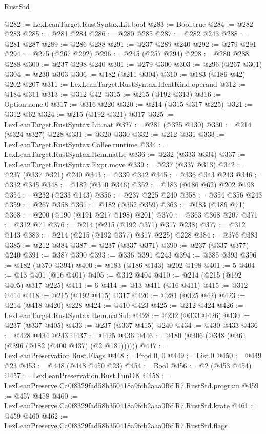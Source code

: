 \begin{lexlean}{RustStd}
\begin{coremodule}
@282 := LexLeanTarget.RustSyntax.Lit.bool
@283 := Bool.true
@284 := @282 @283
@285 := @281 @284
@286 := @280 @285
@287 := @282 @243
@288 := @281 @287
@289 := @286 @288
@291 := @237 @289 @240
@292 := @279 @291
@294 := @275 (@267 @292)
@296 := @245 (@257 @294)
@298 := @280 @288 @288
@300 := @237 @298 @240
@301 := @279 @300
@303 := @296 (@267 @301)
@304 := @230 @303
@306 := @182 (@211 @304)
@310 := @183 (@186 @42) @202 @207
@311 := LexLeanTarget.RustSyntax.IdentKind.operand
@312 := @184 @311
@313 := @312 @42
@315 := @215 (@192 @313)
@316 := Option.none.{0}
@317 := @316 @220
@320 := @214 (@315 @317 @225)
@321 := @312 @62
@324 := @215 (@192 @321) @317
@325 := LexLeanTarget.RustSyntax.Lit.nat
@327 := @281 (@325 @130)
@330 := @214 (@324 @327) @228
@331 := @320 @330
@332 := @212 @331
@333 := LexLeanTarget.RustSyntax.Callee.runtime
@334 := LexLeanTarget.RustSyntax.Item.natLe
@336 := @232 (@333 @334)
@337 := LexLeanTarget.RustSyntax.Expr.move
@339 := @237 (@337 @313)
@342 := @237 (@337 @321) @240
@343 := @339 @342
@345 := @336 @343 @243
@346 := @332 @345
@348 := @182 (@310 @346)
@352 := @183 (@186 @62) @202 @198
@354 := @232 (@233 @143)
@356 := @237 @225 @240
@358 := @354 @356 @243
@359 := @267 @358
@361 := @182 (@352 @359)
@363 := @183 (@186 @71)
@368 := @200 (@190 (@191 @217 @198) @201)
@370 := @363 @368 @207
@371 := @312 @71
@376 := @214 (@215 (@192 @371) @317 @238)
@377 := @312 @143
@383 := @214 (@215 (@192 @377) @317 @225) @228
@384 := @376 @383
@385 := @212 @384
@387 := @237 (@337 @371)
@390 := @237 (@337 @377) @240
@391 := @387 @390
@393 := @336 @391 @243
@394 := @385 @393
@396 := @182 (@370 @394)
@400 := @183 (@186 @143) @202 @198
@401 := 5
@404 := @13 @401 (@16 @401)
@405 := @312 @404
@410 := @214 (@215 (@192 @405) @317 @225)
@411 := 6
@414 := @13 @411 (@16 @411)
@415 := @312 @414
@418 := @215 (@192 @415) @317
@420 := @281 (@325 @42)
@423 := @214 (@418 @420) @228
@424 := @410 @423
@425 := @212 @424
@426 := LexLeanTarget.RustSyntax.Item.natSub
@428 := @232 (@333 @426)
@430 := @237 (@337 @405)
@433 := @237 (@337 @415) @240
@434 := @430 @433
@436 := @428 @434 @243
@437 := @425 @436
@446 := @180 (@306 (@348 (@361 (@396 (@182 (@400 @437) (@2 @181))))))
@447 := LexLeanPreservation.Rust.Flags
@448 := Prod.{0, 0}
@449 := List.{0}
@450 := @449 @23
@453 := @448 (@448 @450 @23)
@454 := Bool
@456 := @2 (@453 @454)
@457 := LexLeanPreservation.Rust.FunOK
@458 := LexLeanPreserve.Ca0f8329fad58b350418a9fcb2aaa0f6f.R7.RustStd.program
@459 := @457 @458
@460 := LexLeanPreserve.Ca0f8329fad58b350418a9fcb2aaa0f6f.R7.RustStd.krate
@461 := @459 @460
@462 := LexLeanPreserve.Ca0f8329fad58b350418a9fcb2aaa0f6f.R7.RustStd.flags

\end{coremodule}
\end{lexlean}
